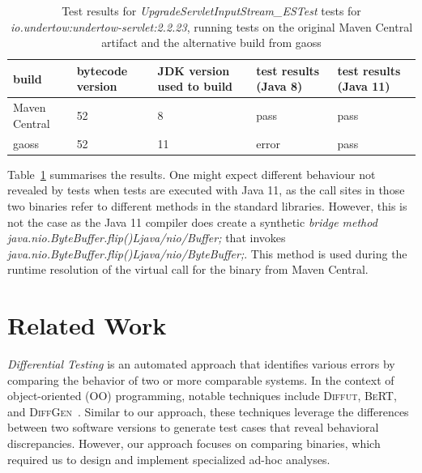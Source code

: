 \documentclass[conference]{IEEEtran}
\begin{document}
\begin{table}[]
	\begin{tabular}{|p{1.8cm}p{0.9cm}p{1.5cm}p{1.2cm}p{1.2cm}|}
		\hline
		build         & bytecode version & JDK version used to build & test results (Java 8)                                                    & test results (Java 11) \\ \hline 
		Maven Central & 52               & 8                         & pass                                                                     & pass                   \\
		gaoss         & 52               & 11                        & error & pass                  \\ \hline
	\end{tabular}
	\caption{Test results for \textit{UpgradeServletInputStream\_ESTest} tests for  \textit{io.undertow:undertow-servlet:2.2.23}, running tests on the original Maven Central artifact and the alternative build from gaoss}
	\label{tab:nosuchmethoderror}
\end{table}

Table~\ref{tab:nosuchmethoderror} summarises the results. One might expect different behaviour not revealed by tests when tests are executed with Java 11, as the call sites in those two binaries refer to different methods in the standard libraries. However, this is not the case as the Java 11 compiler does create a synthetic \textit{bridge method} \textit{java.nio.ByteBuffer.flip()Ljava/nio/Buffer;}  that invokes \textit{java.nio.ByteBuffer.flip()Ljava/nio/ByteBuffer;}. This method is used during the  runtime resolution of the virtual call for the binary from Maven Central.  




\section{Related Work}

\emph{Differential Testing}\cite{difftesting} is an automated approach that identifies various errors by comparing the behavior of two or more comparable systems\cite{xie2007towards,jin10
,diffgen}. In the context of object-oriented (OO) programming, notable techniques include \textsc{Diffut}\cite{xie2007towards}, \textsc{BeRT}\cite{jin10
}, and \textsc{DiffGen}~\cite{diffgen}. Similar to our approach, these techniques leverage the differences between two software versions to generate test cases that reveal behavioral discrepancies. However, our approach focuses on comparing binaries, which required us to design and implement specialized ad-hoc analyses.
\end{document}
